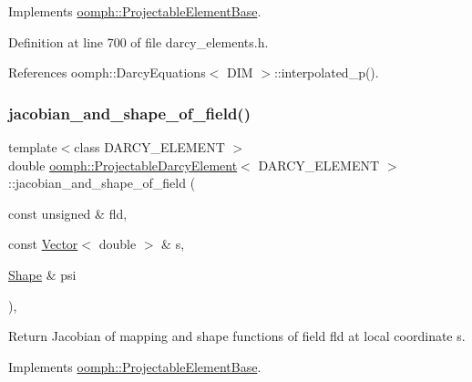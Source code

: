Implements \hyperlink{classoomph_1_1ProjectableElementBase_ae4da5b565b6d333be2f5920f7be763cd}{oomph\+::\+Projectable\+Element\+Base}.



Definition at line 700 of file darcy\+\_\+elements.\+h.



References oomph\+::\+Darcy\+Equations$<$ D\+I\+M $>$\+::interpolated\+\_\+p().

\mbox{\label{classoomph_1_1ProjectableDarcyElement_a2dad4f7a1d4bdeeb2bc928677572db03}} 
\subsubsection{\texorpdfstring{jacobian\+\_\+and\+\_\+shape\+\_\+of\+\_\+field()}{jacobian\_and\_shape\_of\_field()}}
{\footnotesize\ttfamily template$<$class D\+A\+R\+C\+Y\+\_\+\+E\+L\+E\+M\+E\+NT $>$ \\
double \hyperlink{classoomph_1_1ProjectableDarcyElement}{oomph\+::\+Projectable\+Darcy\+Element}$<$ D\+A\+R\+C\+Y\+\_\+\+E\+L\+E\+M\+E\+NT $>$\+::jacobian\+\_\+and\+\_\+shape\+\_\+of\+\_\+field (\begin{DoxyParamCaption}\item[{const unsigned \&}]{fld,  }\item[{const \hyperlink{classoomph_1_1Vector}{Vector}$<$ double $>$ \&}]{s,  }\item[{\hyperlink{classoomph_1_1Shape}{Shape} \&}]{psi }\end{DoxyParamCaption})\hspace{0.3cm}{\ttfamily [inline]}, {\ttfamily [virtual]}}



Return Jacobian of mapping and shape functions of field fld at local coordinate s. 



Implements \hyperlink{classoomph_1_1ProjectableElementBase_ad45c21b58c0985d52f68ab2d79cbb488}{oomph\+::\+Projectable\+Element\+Base}.



